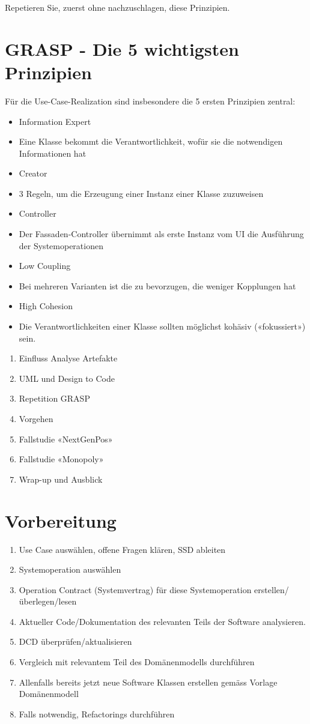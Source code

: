 \documentclass[10pt]{article}
\begin{document}
Repetieren Sie, zuerst ohne nachzuschlagen, diese Prinzipien.

\section*{GRASP - Die 5 wichtigsten Prinzipien}
Für die Use-Case-Realization sind insbesondere die 5 ersten Prinzipien zentral:

\begin{itemize}
  \item Information Expert
  \item Eine Klasse bekommt die Verantwortlichkeit, wofür sie die notwendigen Informationen hat
  \item Creator
  \item 3 Regeln, um die Erzeugung einer Instanz einer Klasse zuzuweisen
  \item Controller
  \item Der Fassaden-Controller übernimmt als erste Instanz vom UI die Ausführung der Systemoperationen
  \item Low Coupling
  \item Bei mehreren Varianten ist die zu bevorzugen, die weniger Kopplungen hat
  \item High Cohesion
  \item Die Verantwortlichkeiten einer Klasse sollten möglichst kohäsiv («fokussiert») sein.
\end{itemize}

\begin{enumerate}
  \item Einfluss Analyse Artefakte
  \item UML und Design to Code
  \item Repetition GRASP
  \item Vorgehen
  \item Fallstudie «NextGenPos»
  \item Fallstudie «Monopoly»
  \item Wrap-up und Ausblick
\end{enumerate}

\section*{Vorbereitung}
\begin{enumerate}
  \item Use Case auswählen, offene Fragen klären, SSD ableiten
  \item Systemoperation auswählen
  \item Operation Contract (Systemvertrag) für diese Systemoperation erstellen/überlegen/lesen
  \item Aktueller Code/Dokumentation des relevanten Teils der Software analysieren.
  \item DCD überprüfen/aktualisieren
  \item Vergleich mit relevantem Teil des Domänenmodells durchführen
  \item Allenfalls bereits jetzt neue Software Klassen erstellen gemäss Vorlage Domänenmodell
  \item Falls notwendig, Refactorings durchführen
\end{enumerate}
\end{document}
